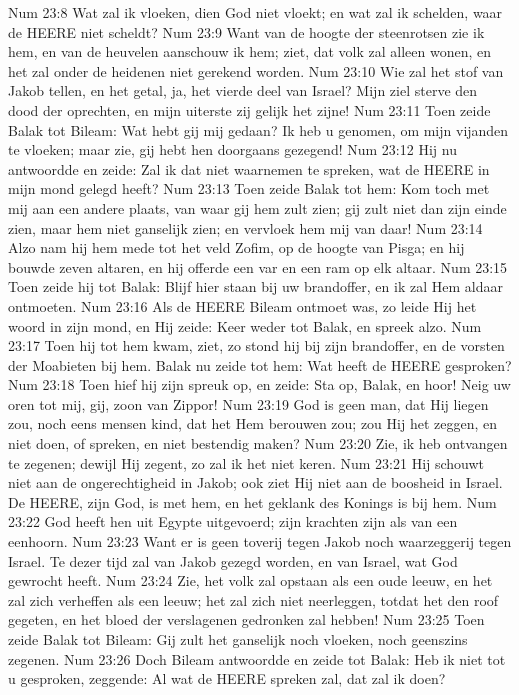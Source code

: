 Num 23:8  Wat zal ik vloeken, dien God niet vloekt; en wat zal ik schelden, waar de HEERE niet scheldt?
Num 23:9  Want van de hoogte der steenrotsen zie ik hem, en van de heuvelen aanschouw ik hem; ziet, dat volk zal alleen wonen, en het zal onder de heidenen niet gerekend worden.
Num 23:10  Wie zal het stof van Jakob tellen, en het getal, ja, het vierde deel van Israel? Mijn ziel sterve den dood der oprechten, en mijn uiterste zij gelijk het zijne!
Num 23:11  Toen zeide Balak tot Bileam: Wat hebt gij mij gedaan? Ik heb u genomen, om mijn vijanden te vloeken; maar zie, gij hebt hen doorgaans gezegend!
Num 23:12  Hij nu antwoordde en zeide: Zal ik dat niet waarnemen te spreken, wat de HEERE in mijn mond gelegd heeft?
Num 23:13  Toen zeide Balak tot hem: Kom toch met mij aan een andere plaats, van waar gij hem zult zien; gij zult niet dan zijn einde zien, maar hem niet ganselijk zien; en vervloek hem mij van daar!
Num 23:14  Alzo nam hij hem mede tot het veld Zofim, op de hoogte van Pisga; en hij bouwde zeven altaren, en hij offerde een var en een ram op elk altaar.
Num 23:15  Toen zeide hij tot Balak: Blijf hier staan bij uw brandoffer, en ik zal Hem aldaar ontmoeten.
Num 23:16  Als de HEERE Bileam ontmoet was, zo leide Hij het woord in zijn mond, en Hij zeide: Keer weder tot Balak, en spreek alzo.
Num 23:17  Toen hij tot hem kwam, ziet, zo stond hij bij zijn brandoffer, en de vorsten der Moabieten bij hem. Balak nu zeide tot hem: Wat heeft de HEERE gesproken?
Num 23:18  Toen hief hij zijn spreuk op, en zeide: Sta op, Balak, en hoor! Neig uw oren tot mij, gij, zoon van Zippor!
Num 23:19  God is geen man, dat Hij liegen zou, noch eens mensen kind, dat het Hem berouwen zou; zou Hij het zeggen, en niet doen, of spreken, en niet bestendig maken?
Num 23:20  Zie, ik heb ontvangen te zegenen; dewijl Hij zegent, zo zal ik het niet keren.
Num 23:21  Hij schouwt niet aan de ongerechtigheid in Jakob; ook ziet Hij niet aan de boosheid in Israel. De HEERE, zijn God, is met hem, en het geklank des Konings is bij hem.
Num 23:22  God heeft hen uit Egypte uitgevoerd; zijn krachten zijn als van een eenhoorn.
Num 23:23  Want er is geen toverij tegen Jakob noch waarzeggerij tegen Israel. Te dezer tijd zal van Jakob gezegd worden, en van Israel, wat God gewrocht heeft.
Num 23:24  Zie, het volk zal opstaan als een oude leeuw, en het zal zich verheffen als een leeuw; het zal zich niet neerleggen, totdat het den roof gegeten, en het bloed der verslagenen gedronken zal hebben!
Num 23:25  Toen zeide Balak tot Bileam: Gij zult het ganselijk noch vloeken, noch geenszins zegenen.
Num 23:26  Doch Bileam antwoordde en zeide tot Balak: Heb ik niet tot u gesproken, zeggende: Al wat de HEERE spreken zal, dat zal ik doen?
